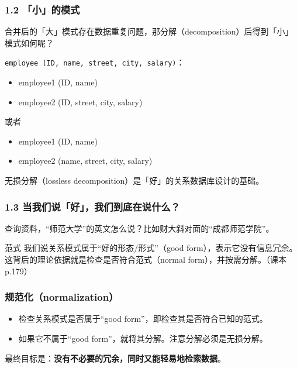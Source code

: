 \documentclass[aspectratio=169, 14pt]{beamer}
\begin{document}
\begin{frame}
    \frametitle{1.2 「小」的模式}
    合并后的「大」模式存在数据重复问题，那分解（decomposition）后得到「小」模式如何呢？

\texttt{employee (ID, name, street, city, salary)}：

\begin{itemize}
    \item employee1 (ID, name) 
    \item employee2 (ID, street, city, salary)
\end{itemize}

或者
\begin{itemize}
    \item employee1 (ID, name) 
    \item employee2 (name, street, city, salary)
\end{itemize}

\end{frame}

{
\begin{frame}[standout]
    无损分解（lossless decomposition）是「好」的关系数据库设计的基础。
\end{frame}
}

\begin{frame}
    \frametitle{1.3 当我们说「好」，我们到底在说什么？}

 查询资料，“师范大学”的英文怎么说？比如财大斜对面的“成都师范学院”。

\pause
\begin{exampleblock}{范式}
    我们说关系模式属于“好的形态/形式”（good form），表示它\alert{没有信息冗余}。这背后的理论依据就是检查是否符合\alert{范式}（normal form），并按需\alert{分解}。（课本p.179）    
\end{exampleblock}
\end{frame}

\begin{frame}
    \frametitle{规范化（normalization）}

    \begin{itemize}
        \item 检查关系模式是否属于“good form”，即检查其是否符合已知的范式。
        \item 如果它不属于“good form”，就将其分解。注意分解必须是无损分解。
    \end{itemize}

     最终目标是：\textbf{没有不必要的冗余，同时又能轻易地检索数据}。
\end{frame}
\end{document}
